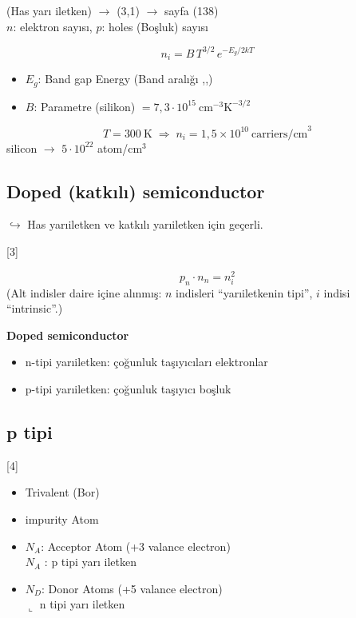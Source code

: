 \documentclass[11pt,a4paper]{article}
\begin{document}
\noindent (Has yarı iletken)
$\rightarrow$ (3,1) $\rightarrow$ sayfa (138)\\
$n$: elektron sayısı, \quad $p$: holes (Boşluk) sayısı

\[ n_i = B\,T^{3/2}\,e^{-E_g/2kT} \]
\begin{itemize}
  \item $E_g$: Band gap Energy (Band aralığı ,,)
  \item $B$: Parametre (silikon) $= 7{,}3\cdot10^{15}\ \mathrm{cm^{-3}K^{-3/2}}$
\end{itemize}
\[ T = 300\ \mathrm{K} \;\Rightarrow\; n_i = 1{,}5\times10^{10}\ \text{carriers/cm}^3 \]
silicon $\rightarrow$ $5\cdot10^{22}$ atom/cm$^3$

\subsection{Doped (katkılı) semiconductor}
$\hookrightarrow$ Has yarıiletken ve katkılı yarıiletken için geçerli.

[3]

\[ p_n \cdot n_n = n_i^2 \]
{\small\color{kursunkalem}(Alt indisler daire içine alınmış: $n$ indisleri ``yarıiletkenin tipi'', $i$ indisi ``intrinsic''.)}

\medskip
\noindent {}

\noindent{}

\medskip
\noindent \textbf{Doped semiconductor}
\begin{itemize}
  \item n-tipi yarıiletken: çoğunluk taşıyıcıları elektronlar
  \item p-tipi yarıiletken: çoğunluk taşıyıcı boşluk
\end{itemize}

\subsection{p tipi}
[4]
\begin{itemize}
  \item Trivalent (Bor)
  \item impurity Atom
  \item $N_A$: Acceptor Atom (+3 valance electron)\\ \hspace*{1em}$N_A$ : p tipi yarı iletken
  \item $N_D$: Donor Atoms (+5 valance electron)\\ \hspace*{1em}$\llcorner$ n tipi yarı iletken
\end{itemize}
\end{document}

